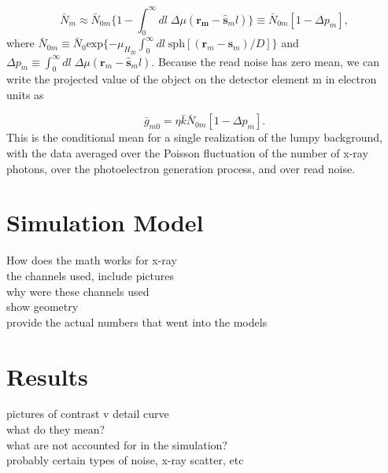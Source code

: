 \begin{equation}\label{eq:xrayatten-approx}
\bar{N}_{m} \approx \bar{N}_{0m} \{ 1 - \int_{0}^{\infty} dl \;
\Delta \mu (\mathbf{r_m} - \hat{\mathbf{s}}_m l)\} \equiv
\bar{N}_{0m} [ 1 - \Delta p_m  ],
\end{equation}
where 
$\bar{N}_{0m} \equiv \bar{N}_0 \mathrm{exp} \{ -\mu_{H_20} \int_{0}^{\infty} dl \; 
\mathrm{sph} [(\mathbf{r}_m - \mathbf{s}_m)/D] \}$ and 
$\Delta p_m \equiv \int_{0}^{\infty} dl \; \Delta \mu(\mathbf{r}_m - \mathbf{\hat{s}}_m l )$. Because the read noise has zero mean, we can write the projected value of the object on the detector element m in electron units as

\begin{equation}\label{eq:g_ElectronUnit}
\bar{g}_{m0} = \eta \bar{k}\bar{N}_{0m}[1 - \Delta p_m].
\end{equation}
This is the conditional mean for a single realization of the lumpy background, with the data averaged over the Poisson fluctuation of the number of x-ray photons, over the photoelectron generation process, and over read noise.  
\section{Simulation Model}


How does the math works for x-ray\\
the channels used, include pictures\\
why were these channels used\\
show geometry\\
provide the actual numbers that went into the models\\


\section{Results}

pictures of contrast v detail curve\\
what do they mean?\\
what are not accounted for in the simulation?\\
probably certain types of noise, x-ray scatter, etc\\